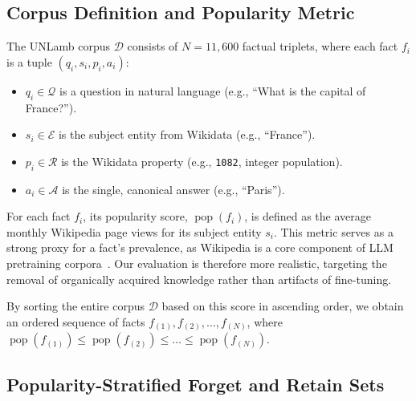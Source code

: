 \documentclass[sigconf,anonymous]{aamas}
\begin{document}
\subsection{Corpus Definition and Popularity Metric}

The UNLamb corpus $\mathcal{D}$ consists of $N=11,600$ factual triplets, where each fact $f_i$ is a tuple $(q_i, s_i, p_i, a_i)$:
\begin{itemize}
    \item $q_i \in \mathcal{Q}$ is a question in natural language (e.g., \enquote{What is the capital of France?}).
    \item $s_i \in \mathcal{E}$ is the subject entity from Wikidata (e.g., \enquote{France}).
    \item $p_i \in \mathcal{R}$ is the Wikidata property (e.g., \texttt{1082}, integer population).
    \item $a_i \in \mathcal{A}$ is the single, canonical answer (e.g., \enquote{Paris}).
\end{itemize}


For each fact $f_i$, its popularity score, $\operatorname{pop}(f_i)$, is defined as the average monthly Wikipedia page views for its subject entity $s_i$.
This metric serves as a strong proxy for a fact's prevalence, as Wikipedia is a core component of LLM pretraining corpora~\cite{gao2020pile, dodge2021documenting}. Our evaluation is therefore more realistic, targeting the removal of organically acquired knowledge rather than artifacts of fine-tuning.


By sorting the entire corpus $\mathcal{D}$ based on this score in ascending order, we obtain an ordered sequence of facts $f_{(1)}, f_{(2)}, \dots, f_{(N)}$, where $\operatorname{pop}(f_{(1)}) \le \operatorname{pop}(f_{(2)}) \le \dots \le \operatorname{pop}(f_{(N)})$.

\subsection{Popularity-Stratified Forget and Retain Sets}
\label{subsec:popular-strat}
\end{document}
